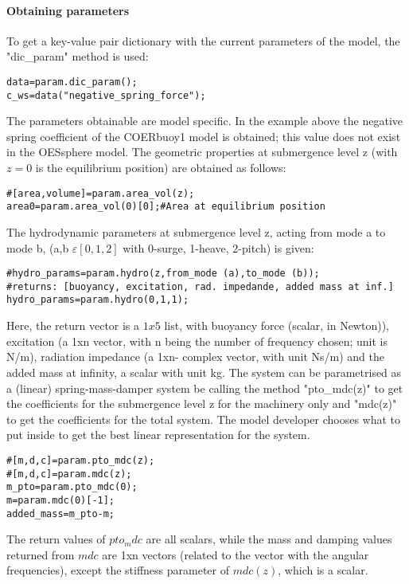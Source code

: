 \documentclass[oneside,10pt,a4paper]{book}
\begin{document}
\paragraph{Obtaining parameters}
To get a key-value pair dictionary with the current parameters of the model, the "dic\_param" method is used:
\begin{verbatim}
data=param.dic_param();
c_ws=data("negative_spring_force");
\end{verbatim}
The parameters obtainable are model specific. In the example above the negative spring coefficient of the COERbuoy1 model is obtained; this value does not exist in the OESsphere model.
The geometric properties at submergence level z (with $z=0$ is the equilibrium position) are obtained as follows:
\begin{verbatim}
#[area,volume]=param.area_vol(z);
area0=param.area_vol(0)[0];#Area at equilibrium position
\end{verbatim}
The hydrodynamic parameters at submergence level z, acting from mode a to mode b, (a,b $\varepsilon[0,1,2]$ with 0-surge, 1-heave, 2-pitch) is given:
\begin{verbatim}
#hydro_params=param.hydro(z,from_mode (a),to_mode (b));
#returns: [buoyancy, excitation, rad. impedande, added mass at inf.]
hydro_params=param.hydro(0,1,1);
\end{verbatim}
Here, the return vector is a $1x5$ list, with buoyancy force (scalar, in Newton)), excitation (a 1xn vector, with n being the number of frequency chosen; unit is N/m), radiation impedance (a 1xn- complex vector, with unit Ns/m) and the added mass at infinity, a scalar with unit kg.
The system can be parametrised as a (linear) spring-mass-damper system be calling the method "pto\_mdc(z)" to get the coefficients for the submergence level z for the machinery only and "mdc(z)" to get the coefficients for the total system. The model developer chooses what to put inside to get the best linear representation for the system.
\begin{verbatim}
#[m,d,c]=param.pto_mdc(z);
#[m,d,c]=param.mdc(z);
m_pto=param.pto_mdc(0);
m=param.mdc(0)[-1];
added_mass=m_pto-m;
\end{verbatim}
The return values of $pto_mdc$ are all scalars, while the mass and damping values returned from $mdc$ are 1xn vectors (related to the vector with the angular frequencies), except the stiffness parameter of $mdc(z)$, which is a scalar.
\end{document}
